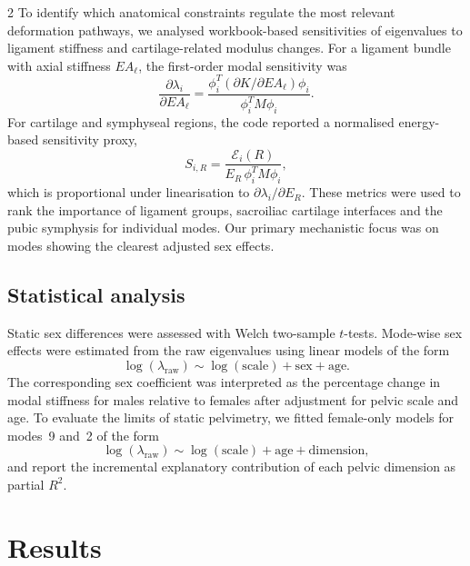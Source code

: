 \documentclass[openacc]{rsproca_new}
\begin{document}
\begin{multicols}{2}
To identify which anatomical constraints regulate the most relevant deformation pathways, we analysed workbook-based sensitivities of eigenvalues to ligament stiffness and cartilage-related modulus changes. For a ligament bundle with axial stiffness $EA_{\ell}$, the first-order modal sensitivity was
\begin{equation}
\frac{\partial \lambda_{i}}{\partial EA_{\ell}}
=
\frac{\phi_{i}^{T}(\partial K/\partial EA_{\ell})\phi_{i}}
{\phi_{i}^{T}M\phi_{i}}.
\end{equation}
For cartilage and symphyseal regions, the code reported a normalised energy-based sensitivity proxy,
\begin{equation}
S_{i,R}=\frac{\mathcal{E}_{i}(R)}{E_{R}\,\phi_{i}^{T}M\phi_{i}},
\end{equation}
which is proportional under linearisation to $\partial \lambda_{i}/\partial E_{R}$. These metrics were used to rank the importance of ligament groups, sacroiliac cartilage interfaces and the pubic symphysis for individual modes. Our primary mechanistic focus was on modes showing the clearest adjusted sex effects.

\subsection{Statistical analysis}

Static sex differences were assessed with Welch two-sample $t$-tests. Mode-wise sex effects were estimated from the raw eigenvalues using linear models of the form
\begin{equation}
\log(\lambda_{\mathrm{raw}}) \sim \log(\mathrm{scale}) + \mathrm{sex} + \mathrm{age}.
\end{equation}
The corresponding sex coefficient was interpreted as the percentage change in modal stiffness for males relative to females after adjustment for pelvic scale and age. To evaluate the limits of static pelvimetry, we fitted female-only models for modes~9 and~2 of the form
\begin{equation}
\log(\lambda_{\mathrm{raw}}) \sim \log(\mathrm{scale}) + \mathrm{age} + \mathrm{dimension},
\end{equation}
and report the incremental explanatory contribution of each pelvic dimension as partial $R^2$.

\section{Results}


\end{multicols}
\end{document}
